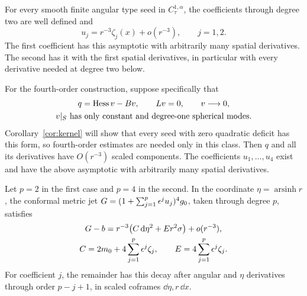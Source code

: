 \begin{lemma}
\label{ana:coefficients}
For every smooth finite angular type seed in $C^{1,\alpha}_\tau$,
the coefficients through degree two are well defined and
\[
  u_j=r^{-3}\zeta_j(x)+o(r^{-3}),\qquad j=1,2.
\]
The first coefficient has this asymptotic with arbitrarily many
spatial derivatives.  The second has it with the first spatial
derivatives, in particular with every derivative needed at degree
two below.

For the fourth-order construction, suppose specifically that
\begin{equation}
 \begin{gathered}
 q=\operatorname{Hess} v-Bv,\qquad Lv=0,\qquad v\longrightarrow0,\\
 v|_S\text{ has only constant and degree-one spherical modes}.
 \end{gathered}
 \label{ana:kernel-seed}
\end{equation}
Corollary~\ref{cor:kernel} will show that every seed with zero quadratic
deficit has this form, so fourth-order estimates are needed only in
this class. Then $q$ and all its derivatives have $O(r^{-3})$ scaled
components.
The coefficients $u_1,\ldots,u_4$ exist and have the above asymptotic
with arbitrarily many spatial derivatives.

Let $p=2$ in the first case and $p=4$ in the second.  In the coordinate
$\eta=\operatorname{arsinh}r$, the conformal metric jet
$G=(1+\sum_{j=1}^p\epsilon^ju_j)^4g_0$, taken through degree $p$, satisfies
\begin{equation}
 \begin{gathered}
 G-b=r^{-3}\bigl(C\,\mathrm{d}\eta^2+E r^2\sigma\bigr)+o(r^{-3}),\\
 C=2m_0+4\sum_{j=1}^p\epsilon^j\zeta_j,\qquad
 E=4\sum_{j=1}^p\epsilon^j\zeta_j.
 \end{gathered}
 \label{ana:metric-asymptotic}
\end{equation}
For coefficient $j$, the remainder has this decay after angular and
$\eta$ derivatives through order $p-j+1$, in scaled coframes
$\dd\eta,r\,\dd x$.
\end{lemma}

